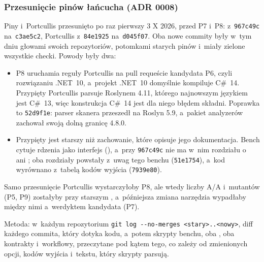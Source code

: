 \subsubsection{Przesunięcie pinów łańcucha (ADR 0008)}\label{sec:bench-pins-adr}
Piny  i~Portcullis przesunięto po raz pierwszy 3 X 2026, przed P7 i~P8:
 z~\texttt{967c49c} na~\texttt{c3ae5c2}, Portcullis z~\texttt{84e1925}
na~\texttt{d045f07}. Oba nowe commity były w~tym dniu głowami  swoich repozytoriów,
potomkami starych pinów i~miały zielone wszystkie checki. Powody były dwa:
\begin{itemize}
  \item P8 uruchamia reguły Portcullis na pull requeście kandydata P6, czyli rozwiązaniu
    .NET~10, a~projekt .NET~10 domyślnie kompiluje C\#~14. Przypięty Portcullis parsuje
    Roslynem 4.11, którego najnowszym językiem jest C\#~13, więc konstrukcja C\#~14 jest dla
    niego błędem składni. Poprawka to \texttt{52d9f1e}: parser skanera przeszedł na
    Roslyn 5.9, a~pakiet analyzerów zachował swoją dolną granicę 4.8.0.
  \item Przypięty  jest starszy niż zachowanie, które opisuje jego dokumentacja.
    Bench cytuje  rdzenia jako interfejs 
    (), a~przy \texttt{967c49c} nie ma w~nim rozdziału
    o~ ani ; oba rozdziały powstały z~uwag tego
    benchu (\texttt{51e1754}), a~kod wyrównano z~tabelą kodów wyjścia (\texttt{7939e80}).
\end{itemize}
Samo przesunięcie Portcullis wystarczyłoby P8, ale wtedy liczby A/A i~mutantów (P5, P9)
zostałyby przy starszym , a~późniejsza zmiana narzędzia wypadłaby między nimi
a~werdyktem kandydata (P7).

Metoda: w~każdym repozytorium \texttt{git log -{}-no-merges <stary>..<nowy>}, diff każdego
commita, który dotyka kodu, a~potem skrypty benchu, oba , oba kontrakty
i~workflowy, przeczytane pod kątem tego, co zależy od zmienionych opcji, kodów wyjścia
i~tekstu, który skrypty parsują.

